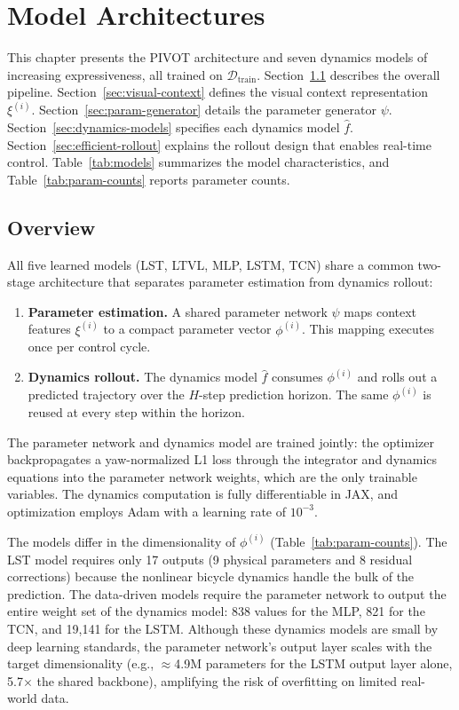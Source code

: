 \chapter{Model Architectures}
\label{sec:models}

This chapter presents the PIVOT architecture and seven dynamics models of increasing expressiveness, all trained on $\mathcal{D}_{\text{train}}$. Section~\ref{sec:overview} describes the overall pipeline. Section~\ref{sec:visual-context} defines the visual context representation $\xi^{(i)}$. Section~\ref{sec:param-generator} details the parameter generator $\psi$. Section~\ref{sec:dynamics-models} specifies each dynamics model $\hat{f}$. Section~\ref{sec:efficient-rollout} explains the rollout design that enables real-time control. Table~\ref{tab:models} summarizes the model characteristics, and Table~\ref{tab:param-counts} reports parameter counts.

\section{Overview}
\label{sec:overview}

All five learned models (LST, LTVL, MLP, LSTM, TCN) share a common two-stage architecture that separates parameter estimation from dynamics rollout:

\begin{enumerate}
  \item \textbf{Parameter estimation.} A shared parameter network $\psi$ maps context features $\xi^{(i)}$ to a compact parameter vector $\phi^{(i)}$. This mapping executes once per control cycle.
  \item \textbf{Dynamics rollout.} The dynamics model $\hat{f}$ consumes $\phi^{(i)}$ and rolls out a predicted trajectory over the $H$-step prediction horizon. The same $\phi^{(i)}$ is reused at every step within the horizon.
\end{enumerate}

The parameter network and dynamics model are trained jointly: the optimizer backpropagates a yaw-normalized L1 loss through the integrator and dynamics equations into the parameter network weights, which are the only trainable variables. The dynamics computation is fully differentiable in JAX, and optimization employs Adam with a learning rate of $10^{-3}$.

The models differ in the dimensionality of $\phi^{(i)}$ (Table~\ref{tab:param-counts}). The LST model requires only 17 outputs (9 physical parameters and 8 residual corrections) because the nonlinear bicycle dynamics handle the bulk of the prediction. The data-driven models require the parameter network to output the entire weight set of the dynamics model: 838 values for the MLP, 821 for the TCN, and 19,141 for the LSTM. Although these dynamics models are small by deep learning standards, the parameter network's output layer scales with the target dimensionality (e.g., $\approx$4.9M parameters for the LSTM output layer alone, 5.7$\times$ the shared backbone), amplifying the risk of overfitting on limited real-world data.

